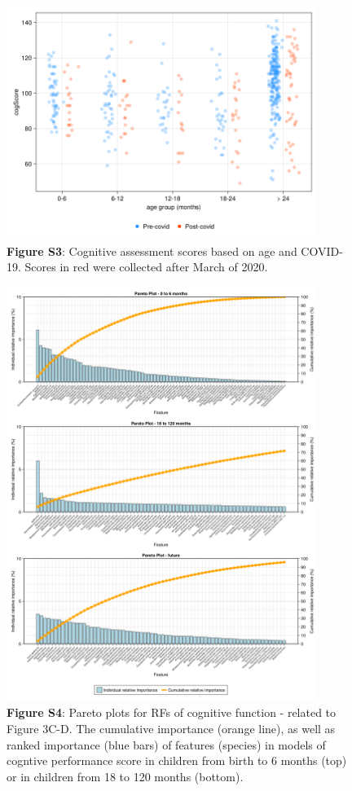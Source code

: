 \documentclass{article}
\begin{document}
\begin{figure}[h]
    \centering
    \includegraphics[width=0.9\textwidth]{assets/Supp_Figure3.png}
    \captionsetup{labelformat=empty}
    \caption{
        \textbf{Figure S3}: Cognitive assessment scores based on age
        and COVID-19. Scores in red were collected after March of 2020.
    }
\end{figure}

\begin{figure}[h]
  \centering
  \includegraphics[width=0.9\textwidth]{assets/Supp_Figure4.png}
  \captionsetup{labelformat=empty}
  \caption{
      \textbf{Figure S4}: Pareto plots for RFs of cognitive function - related to Figure 3C-D.
      The cumulative importance (orange line), as well as ranked importance (blue bars)
      of features (species) in models of cogntive performance score
      in children from birth to 6 months (top) or
      in children from 18 to 120 months (bottom).
  }
\end{figure}
\end{document}
